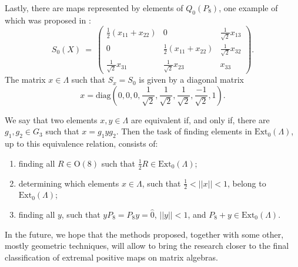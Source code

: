 \documentclass[12pt]{article}
\theoremstyle{plain}
\theoremstyle{definition}
\theoremstyle{remark}
\numberwithin{equation}{section}
\begin{document}
Lastly, there are maps represented by elements of $Q_{0}(P_{8})$,
one example of which was proposed in \cite{miller2015stable}:
\begin{equation}
\label{eq:DefinitionOfS}
S_{0}(X) \:=\: \begin{pmatrix}
        \frac{1}{2}(x_{11} + x_{22}) & 0 & \frac{1}{\sqrt{2}} x_{13} \\
        0 & \frac{1}{2}(x_{11} + x_{22}) & \frac{1}{\sqrt{2}} x_{32} \\
        \frac{1}{\sqrt{2}} x_{31} & \frac{1}{\sqrt{2}} x_{23} & x_{33}
        \end{pmatrix}.
\end{equation}
The matrix $x \in \Lambda$ such that $S_{x} = S_{0}$ is given by
a diagonal matrix 
\begin{equation}
 x = 
\text{diag}(0,0,0, 
\frac{1}{\sqrt{2}}, \frac{1}{\sqrt{2}}, \frac{1}{\sqrt{2}}, \frac{-1}{\sqrt{2}}, 
1).
\end{equation}

We say that two elements $x, y \in \Lambda$
are equivalent if, and only if, there are $g_{1}, g_{2} \in G_{3}$
such that $x = g_{1} y g_{2}$.
Then the task of finding elements in $\text{Ext}_{0}(\Lambda)$,
up to this equivalence relation,
consists of:
\begin{enumerate}
\item finding all $R \in \mathrm{O}(8)$ such that
    $\frac{1}{2}R \in \text{Ext}_{0}(\Lambda)$;
\item determining which elements $x \in \Lambda$,
    such that $\frac{1}{2} < ||x|| < 1$, belong to $\text{Ext}_{0}(\Lambda)$;
\item finding all $y$, such that
    $y P_{8} = P_{8} y = \hat{0}$, $||y|| < 1$,
    and $P_{8} + y \in \text{Ext}_0(\Lambda)$.
\end{enumerate}

In the future,
we hope that the methods proposed,
together with some other, mostly geometric techniques,
will allow to bring the research closer to the final classification
of extremal positive maps on matrix algebras.





\end{document}
